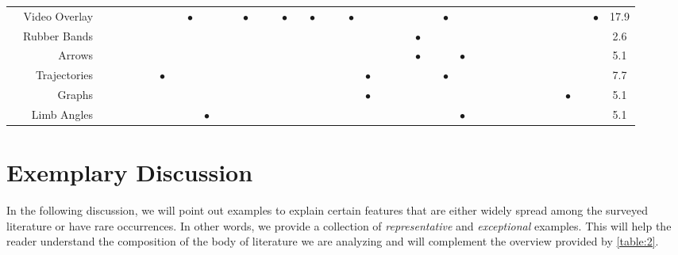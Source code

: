 \begin{table}[thp]
\begin{tiny}
\begin{tabular}{|c|r|c|c|c|c|c|c|c|c|c|c|c|c|c|c|c|c|c|c|c|c|c|c|c|c|c|c|c|c|c|c|c|c|c|c|c|c|c|c|c|c|}
 & Video Overlay &  &  &  &  &  &  &  & $\bullet$ &  &  &  & $\bullet$ &  &  & $\bullet$ &  & $\bullet$ &  &  & $\bullet$ &  &  &  &  &  &  & $\bullet$ &  &  &  &  &  &  &  &  &  &  &  & $\bullet$ & 17.9 \\ \cline{2-42} 
 & Rubber Bands &  &  &  &  &  &  &  &  &  &  &  &  &  &  &  &  &  &  &  &  &  &  &  &  & $\bullet$ &  &  &  &  &  &  &  &  &  &  &  &  &  &  & 2.6 \\ \cline{2-42} 
 & Arrows &  &  &  &  &  &  &  &  &  &  &  &  &  &  &  &  &  &  &  &  &  &  &  &  & $\bullet$ &  &  & $\bullet$ &  &  &  &  &  &  &  &  &  &  &  & 5.1 \\ \cline{2-42} 
 & Trajectories &  &  &  &  &  & $\bullet$ &  &  &  &  &  &  &  &  &  &  &  &  &  &  & $\bullet$ &  &  &  &  &  & $\bullet$ &  &  &  &  &  &  &  &  &  &  &  &  & 7.7 \\ \cline{2-42} 
& Graphs &  &  &  &  &  &  &  &  &  &  &  &  &  &  &  &  &  &  &  &  & $\bullet$ &  &  &  &  &  &  &  &  &  &  &  &  &  &  &  & $\bullet$ &  &  & 5.1 \\ \cline{2-42} 
& Limb Angles &  &  &  &  &  &  &  &  & $\bullet$ &  &  &  &  &  &  &  &  &  &  &  &  &  &  &  &  &  &  & $\bullet$ &  &  &  &  &  &  &  &  &  &  &  & 5.1 \\ \cline{2-42}
\hline
\end{tabular}
\end{tiny}
\end{table}


\section{Exemplary Discussion \label{sec:exemplary}}
In the following discussion, we will point out examples to explain certain features that are either widely spread among the surveyed literature or have rare occurrences. In other words, we provide a collection of \textit{representative} and \textit{exceptional} examples. This will help the reader understand the composition of the body of literature we are analyzing and will complement the overview provided by \autoref{table:2}.


